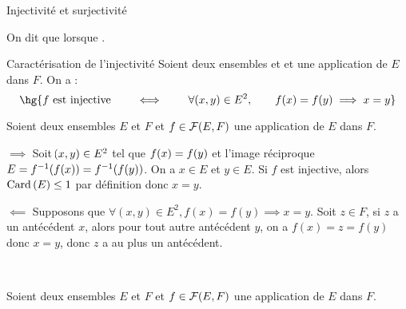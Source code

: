 \documentclass[a4paper,french,bookmarks]{book}
\begin{document}
\begin{enumerate}
{\begin{definition*}{Injectivité et  surjectivité}{}
\begin{enumerate}
                    \itstar On dit que  lorsque .
                \end{enumerate}
            \end{definition*}
            \begin{theorem*}{Caractérisation de l'injectivité}{}
                 Soient deux ensembles  et  et  une application de $E$ dans $F$. On a :
                 \[ \hg{f \ \text{est injective} \qquad\iff\qquad \forall \p{x, y} \in E^2,\qquad f(x) = f(y) \implies x = y} \]
            \end{theorem*}
        }
        \nobefore
        \begin{nproof}
            Soient deux ensembles $E$ et $F$ et $f \in \mathcal{F}\!\left(E, F\right)$ une application de $E$ dans $F$.
            \begin{enumerate}
                \itt $\boxed{\implies}$ Soit $\!\left(x, y\right) \in E^2$ tel que $f\!\left(x\right) = f\!\left(y\right)$ et l'image réciproque $E = f^{-1}\!\left(f(x)\right) = f^{-1}\!\left(f(y)\right)$. On a $x \in E$ et $y \in E$. Si $f$ est injective, alors $\Card{E} \leq 1$ par définition donc $x = y$.
                
                \itt $\boxed{\impliedby}$ Supposons que $\forall (x, y) \in E^2, f(x) = f(y) \implies x = y$. Soit $z \in F$, si $z$ a un antécédent $x$, alors pour tout autre antécédent $y$, on a $f(x) = z = f(y)$ donc $x = y$, donc $z$ a au plus un antécédent.
            \end{enumerate}
            \text{}\\[-20pt]
        \end{nproof}
        \yesafter
        \begin{nproof}
            Soient deux ensembles $E$ et $F$ et $f \in \mathcal{F}\!\left(E, F\right)$ une application de $E$ dans $F$.
            

\end{nproof}
\end{enumerate}
\end{document}
